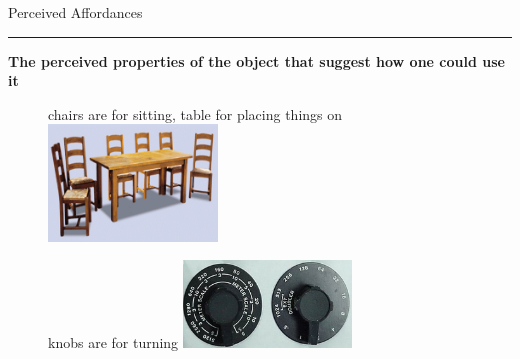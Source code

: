 \documentclass[pdf]{beamer}
\begin{document}
\begin{frame}
{Perceived Affordances}{\textcolor{red}{\rule{12cm}{1.2pt}}}

\textbf{The perceived properties of the object that suggest how one could use it}

\begin{figure}
\centering
chairs are for sitting, table for placing things on
\includegraphics[width=0.4\textwidth]{2_chairs.png}

knobs are for turning
\newline
\includegraphics[width=0.4\textwidth]{2_knobs.jpg}
\end{figure}
\end{frame}
\end{document}

